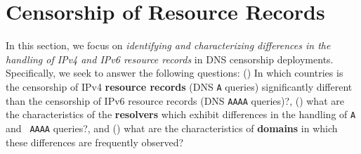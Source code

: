 \section{Censorship of Resource Records} \label{sec:resources}

In this section, we focus on {\it identifying and characterizing differences in
the handling of IPv4 and IPv6 resource records} in DNS censorship deployments.
Specifically, we seek to answer the following questions:
%
() In which countries is the censorship of IPv4
\textbf{resource records} (DNS {\tt A} queries) significantly different than the
censorship of IPv6 resource records (DNS {\tt AAAA} queries)?,
%
() what are the characteristics of the
\textbf{resolvers} which exhibit differences in the handling of {\tt A} and {\tt
AAAA} queries?, and
%
() what are the characteristics of \textbf{domains}
in which these differences are frequently observed?
%
